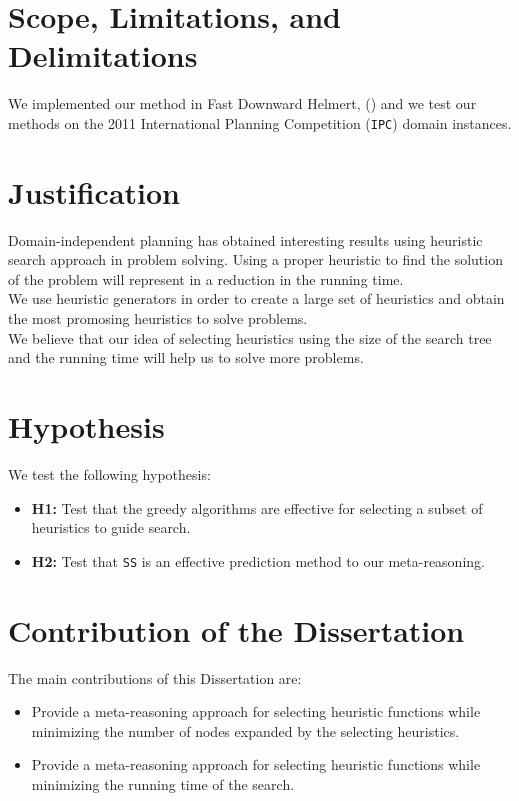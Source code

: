 \section{Scope, Limitations, and Delimitations}
\noindent
We implemented our method in Fast Downward Helmert,  (\citeyear{helmert2006fast}) and we test our methods on the 2011 International Planning Competition (\texttt{IPC}) domain instances.\\

\section{Justification}
\noindent
Domain-independent planning has obtained interesting results using heuristic search approach in problem solving. Using a proper heuristic to find the solution of the problem will represent in a reduction in the running time.\\

We use heuristic generators in order to create a large set of heuristics and obtain the most promosing heuristics to solve problems.\\

We believe that our idea of selecting heuristics using the size of the search tree and the running time will help us to solve more problems.

\section{Hypothesis}
\noindent
We test the following hypothesis:
\begin{itemize}
\item \textbf{H1:} Test that the greedy algorithms are effective for selecting a subset of heuristics to guide search.

\item \textbf{H2:} Test that \texttt{SS} is an effective prediction method to our meta-reasoning.
\end{itemize}

\section{Contribution of the Dissertation}
\noindent
The main contributions of this Dissertation are:
\begin{itemize}
\item Provide a meta-reasoning approach for selecting heuristic functions while minimizing the number of nodes expanded by the selecting heuristics.

\item Provide a meta-reasoning approach for selecting heuristic functions while minimizing the running time of the search. 
\end{itemize}

